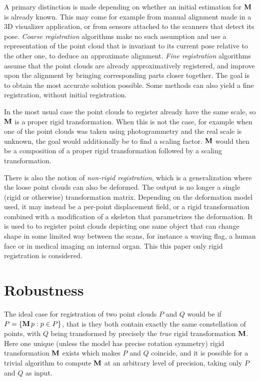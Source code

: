 A primary distinction is made depending on whether an initial estimation for $\mathbf{M}$ is already known. This may come for example from manual alignment made in a 3D visualizer application, or from sensors attached to the scanners that detect its pose. \emph{Coarse registration} algorithms make no such assumption and use a representation of the point cloud that is invariant to its current pose relative to the other one, to deduce an approximate alignment. \emph{Fine registration} algorithms assume that the point clouds are already approximatively registered, and improve upon the alignment by bringing corresponding parts closer together. The goal is to obtain the most accurate solution possible. Some methods can also yield a fine registration, without initial registration.

In the most usual case the point clouds to register already have the same scale, so $\mathbf{M}$ is a proper rigid transformation. When this is not the case, for example when one of the point clouds was taken using photogrammetry and the real scale is unknown, the goal would additionally be to find a scaling factor. $\mathbf{M}$ would then be a composition of a proper rigid transformation followed by a scaling transformation.

There is also the notion of \emph{non-rigid registration}, which is a generalization where the loose point clouds can also be deformed. The output is no longer a single (rigid or otherwise) transformation matrix. Depending on the deformation model used, it may instead be a per-point displacement field, or a rigid transformation combined with a modification of a skeleton that parametrizes the deformation. It is used to to register point clouds depicting one same object that can change shape in some limited way between the scans, for instance a waving flag, a human face or in medical imaging an internal organ. This this paper only rigid registration is considered.


\section{Robustness} \label{sec:registration_robostness}
The ideal case for registration of two point clouds $P$ and $Q$ would be if $P = \{ \mathbf{M} \, p : p \in P \}$, that is they both contain exactly the same constellation of points, with $Q$ being transformed by precisely the \emph{true} rigid transformation $\mathbf{M}$. Here one unique (unless the model has precise rotation symmetry) rigid transformation $\mathbf{M}$ exists which makes $P$ and $Q$ coincide, and it is possible for a trivial algorithm to compute $\mathbf{M}$ at an arbitrary level of precision, taking only $P$ and $Q$ as input.

